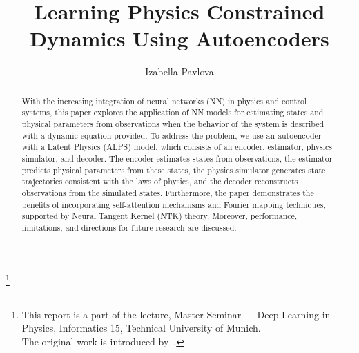 \documentclass[acmtog]{techreportacmart}
\begin{document}
\title{Learning Physics Constrained Dynamics Using Autoencoders} 
\author{Izabella Pavlova}

\renewcommand\shortauthors{Pavlova}

\begin{abstract}
With the increasing integration of neural networks (NN) in physics and control systems, this paper explores the application of NN models for estimating states and physical parameters from observations when the behavior of the system is described with a dynamic equation provided. To address the problem, we use an autoencoder with a Latent Physics (ALPS) model, which consists of an encoder, estimator, physics simulator, and decoder. The encoder estimates states from observations, the estimator predicts physical parameters from these states, the physics simulator generates state trajectories consistent with the laws of physics, and the decoder reconstructs observations from the simulated states. Furthermore, the paper demonstrates the benefits of incorporating self-attention mechanisms and Fourier mapping techniques, supported by Neural Tangent Kernel (NTK) theory. Moreover, performance, limitations, and directions for future research are discussed.
\end{abstract}  

%
%



\thanks{This report is a part of the lecture, Master-Seminar --- Deep Learning in Physics, Informatics 15, Technical University of Munich.
\\
The original work is introduced by~\cite{NEURIPS2022_6d5e0357}.}
\maketitle
\end{document}
